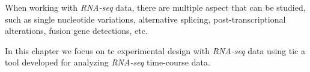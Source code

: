 When working with \textit{RNA-seq} data, there are multiple aspect that can be studied, such as single nucleotide variations, alternative splicing, post-transcriptional alterations, fusion gene detections, etc.


In this chapter we focus on \gls{tc} experimental design with \textit{RNA-seq} data using \gls{tic} a tool developed for analyzing \textit{RNA-seq} time-course data.

